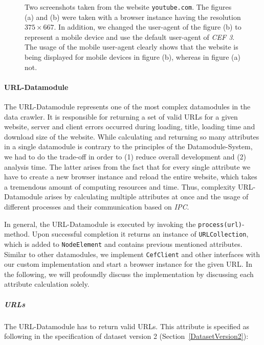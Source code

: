 \begin{figure}
\begin{subfigure}{0.6\textwidth}
		\caption{}
		\label{compare_useragent}
	\end{subfigure}
	\caption[Mobile and desktop screenshots taken by the data crawler]{Two screenshots taken from the website \texttt{youtube.com}. The figures (a) and (b) were taken with a browser instance having the resolution $375 \times 667$. In addition, we changed the user-agent of the figure (b) to represent a mobile device and use the default user-agent of \textit{CEF 3}. The usage of the mobile user-agent clearly shows that the website is being displayed for mobile devices in figure (b), whereas in figure (a) not.}
	\label{compare_resolution_useragent}
\end{figure}

\paragraph*{URL-Datamodule}
\label{datacrawler_url_datamodule}
The URL-Datamodule represents one of the most complex datamodules in the data crawler. It is responsible for returning a set of valid URLs for a given website, server and client errors occurred during loading, title, loading time and download size of the website. While calculating and returning so many attributes in a single datamodule is contrary to the principles of the Datamodule-System, we had to do the trade-off in order to (1) reduce overall development and (2) analysis time. The latter arises from the fact that for every single attribute we have to create a new browser instance and reload the entire website, which takes a tremendous amount of computing resources and time. Thus, complexity URL-Datamodule arises by calculating multiple attributes at once and the usage of different processes and their communication based on \textit{IPC}.

In general, the URL-Datamodule is executed by invoking the \texttt{process(url)}-method. Upon successful completion it returns an instance of \texttt{URLCollection}, which is added to \texttt{NodeElement} and contains previous mentioned attributes. Similar to other datamodules, we implement \texttt{CefClient} and other interfaces with our custom implementation and start a browser instance for the given URL. In the following, we will profoundly discuss the implementation by discussing each attribute calculation solely.

\subparagraph*{URLs}
The URL-Datamodule has to return valid URLs. This attribute is specified as following in the specification of dataset version 2 (Section~\ref{DatasetVersion2}):

